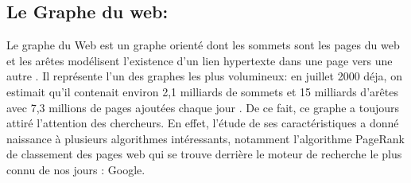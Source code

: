 		\subsection{Le Graphe du web:}
		 Le graphe du Web est un graphe orienté dont les sommets sont les pages du web et les arêtes modélisent l'existence d'un lien hypertexte dans une page vers une autre \citep{brisaboa2009k}. Il représente l'un des graphes les plus volumineux: en juillet 2000 déja, on estimait qu’il contenait environ 2,1 milliards de sommets et 15 milliards d’arêtes avec 7,3 millions de pages ajoutées chaque jour \citep{guillaume2002web}. De ce fait, ce graphe a toujours attiré l'attention des chercheurs. En effet, l'étude de ses caractéristiques a donné naissance à plusieurs algorithmes intéressants, notamment l'algorithme PageRank de classement des pages web qui se trouve derrière le moteur de recherche le plus connu de nos jours : Google.